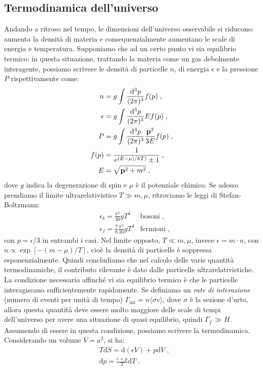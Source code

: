 \documentclass[12pt,a4paper]{report}
\theoremstyle{definition}
\newcommand{\diff}[1][]{\mathrm{d}#1}
\newcommand{\bra}{\langle}
\newcommand{\ket}{\rangle}
\begin{document}
\subsection{Termodinamica dell'universo}
Andando a ritroso nel tempo, le dimensioni dell'universo osservabile si riducono: aumenta la densità di materia e consequenzialmente aumentano le scale di energia e temperatura. Supponiamo che ad un certo punto vi sia equilibrio termico: in questa situazione, trattando la materia come un gas debolmente interagente, possiamo scrivere le densità di particelle $n$, di energia $\epsilon$ e la pressione $P$ rispettivamente come:
\begin{align}
n&=g\int\frac{\diff^3{p}}{(2\pi)^3}f(p)\;,  \\
\epsilon &= g\int\frac{\diff^3{p}}{(2\pi)^3}E f(p)\;,  \\
P&=g\int \frac{\diff^3{p}}{(2\pi)^3}\frac{\mathbf{p}^2}{3E}f(p)\;, \\
f(p) &= \frac{1}{e^{(E-\mu)/kT)}\pm 1}\;, \notag \\
E&=\sqrt{\mathbf{p}^2+m^2}  \notag\;,
\end{align}
dove $g$ indica la degenerazione di spin e $\mu$ è il potenziale chimico. Se adesso prendiamo il limite ultrarelativistico $T\gg m,\mu$, ritroviamo le leggi di Stefan-Boltzmann:
\begin{align*}
&\epsilon_b=\frac{\pi^2}{30}gT^4 &\mbox{bosoni}\;, \\
&\epsilon_f=\frac{7}{8}\frac{\pi^2}{30}gT^4 &\mbox{fermioni}\;,
\end{align*}
con $p=\epsilon/3$ in entrambi i casi. Nel limite opposto, $T\ll m,\mu$, invece $\epsilon=m\cdot n$, con $n\propto \exp[-(m-\mu)/T]$, cioè la densità di particelle è soppressa esponenzialmente. Quindi concludiamo che nel calcolo delle varie quantità termodinamiche, il contributo rilevante è dato dalle particelle ultrarelativistiche. \\
La condizione necessaria affinché vi sia equilibrio termico è che le particelle interagiscano sufficientemente rapidamente. Se definiamo un \emph{rate di interazione} (numero di eventi per unità di tempo) $\Gamma_{\mathrm{int}}=n\bra \sigma v\ket$, dove $\sigma$ è la sezione d'urto, allora questa quantità deve essere molto maggiore delle scale di tempi dell'universo per avere una situazione di quasi equilibrio, quindi $\Gamma_{\mathrm{\int}}\gg H$.\\
Assumendo di essere in questa condizione, possiamo scrivere la termodinamica. Considerando un volume $V=a^3$, si ha:
\begin{align}
&T\diff{S}=\diff{(\epsilon V)}+p\diff{V}\;, \\
&\diff{p}=\frac{\epsilon+p}{T}\diff{T}\;.
\end{align}
\end{document}
